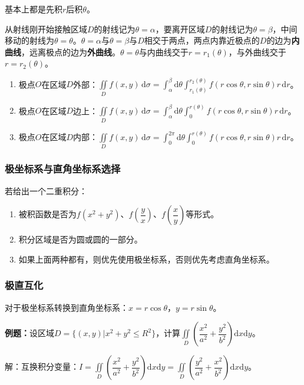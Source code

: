 \documentclass[UTF8, 12pt]{ctexart}
\begin{document}
基本上都是先积$r$后积$\theta$。

从射线刚开始接触区域$D$的射线记为$\theta=\alpha$，要离开区域$D$的射线记为$\theta=\beta$，中间移动的射线为$\theta=\theta$。$\theta=\alpha$与$\theta=\beta$与$D$相交于两点，两点内靠近极点的$D$的边为\textbf{内曲线}，远离极点的边为\textbf{外曲线}。$\theta=\theta$与内曲线交于$r=r_1(\theta)$，与外曲线交于$r=r_2(\theta)$。

\begin{enumerate}
    \item 极点$O$在区域$D$外部：$\iint\limits_Df(x,y)\,\textrm{d}\sigma=\int_\alpha^\beta\textrm{d}\theta\int_{r_1(\theta)}^{r_2(\theta)}f(r\cos\theta,r\sin\theta)r\,\textrm{d}r$。
    \item 极点$O$在区域$D$边上：$\iint\limits_Df(x,y)\,\textrm{d}\sigma=\int_\alpha^\beta\textrm{d}\theta\int_0^{r(\theta)}f(r\cos\theta,r\sin\theta)r\,\textrm{d}r$。
    \item 极点$O$在区域$D$内部：$\iint\limits_Df(x,y)\,\textrm{d}\sigma=\int_0^{2\pi}\textrm{d}\theta\int_0^{r(\theta)}f(r\cos\theta,r\sin\theta)r\,\textrm{d}r$。
\end{enumerate}

\subsubsection{极坐标系与直角坐标系选择}

若给出一个二重积分：

\begin{enumerate}
    \item 被积函数是否为$f(x^2+y^2)$、$f\left(\dfrac{y}{x}\right)$、$f\left(\dfrac{x}{y}\right)$等形式。
    \item 积分区域是否为圆或圆的一部分。
    \item 如果上面两种都有，则优先使用极坐标系，否则优先考虑直角坐标系。
\end{enumerate}

\subsubsection{极直互化}

对于极坐标系转换到直角坐标系：$x=r\cos\theta$，$y=r\sin\theta$。

\textbf{例题：}设区域$D=\{(x,y)|x^2+y^2\leqslant R^2\}$，计算$\displaystyle{\iint\limits_D\left(\dfrac{x^2}{a^2}+\dfrac{y^2}{b^2}\right)\textrm{d}x\textrm{d}y}$。

解：互换积分变量：$I=\displaystyle{\iint\limits_D\left(\dfrac{x^2}{a^2}+\dfrac{y^2}{b^2}\right)\textrm{d}x\textrm{d}y}=\displaystyle{\iint\limits_D\left(\dfrac{y^2}{a^2}+\dfrac{x^2}{b^2}\right)\textrm{d}x\textrm{d}y}$。
\end{document}
